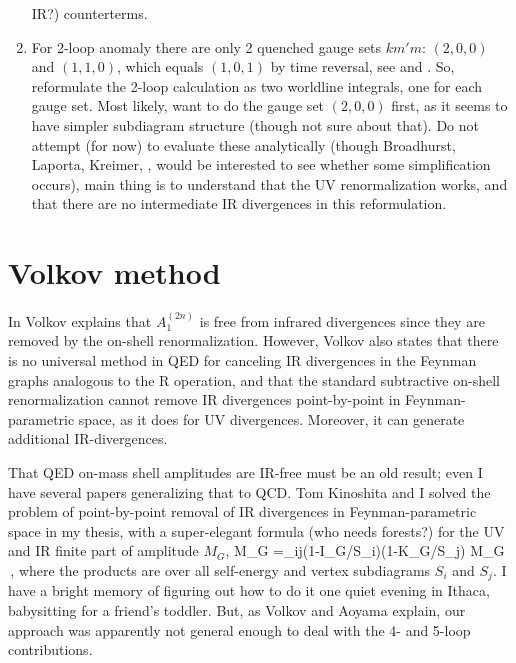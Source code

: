 \begin{enumerate}
IR?) counterterms.
  \item
For 2-loop anomaly there are only 2 quenched gauge sets $km'm$:
$(2,0,0)$ and $(1,1,0)$, which equals $(1,0,1)$ by time reversal, see
 and .
So, reformulate the 2-loop calculation as two worldline integrals,
one for each gauge set.
Most likely, want to do the gauge set $(2,0,0)$ first, as it seems to
have simpler subdiagram structure (though not sure about that).
Do not attempt (for now) to evaluate these analytically (though
Broadhurst, Laporta,
Kreimer, \etc, would be interested to see whether some simplification
occurs), main thing is to understand that the UV renormalization works,
and that there are no intermediate IR divergences in this reformulation.
\end{enumerate}


\section{Volkov method}
\label{sect:Volkov}

In  Volkov explains that $A_1^{(2n)}$ is free from
infrared divergences since they are removed by the on-shell
renormalization.
However, Volkov also states that there is no universal method in QED for
canceling IR divergences in the Feynman graphs analogous to the R
operation, and that the standard subtractive on-shell renormalization
cannot remove IR divergences point-by-point in Feynman-parametric space,
as it does for UV divergences. Moreover, it can generate additional
IR-divergences.

That QED on-mass shell amplitudes are IR-free must be an old result; even
I have several papers generalizing that to
QCD. Tom Kinoshita and I solved
the problem of point-by-point removal of IR divergences in
Feynman-parametric space in my thesis, with a
super-elegant formula (who needs forests?) for the UV and IR finite part
of amplitude $M_G$,
\beq
\Delta M_G =\prod_{ij}(1-I_{G/S_i})(1-K_{G/S_j}) M_G
\,,
where the products are over all self-energy and vertex subdiagrams $S_i$
and $S_j$.
I have a bright memory of figuring out how to do it one quiet evening in
Ithaca, babysitting for a friend's toddler. But, as Volkov
and Aoyama \etal{} explain, our approach was apparently
not general enough to deal with the 4- and 5-loop contributions.

